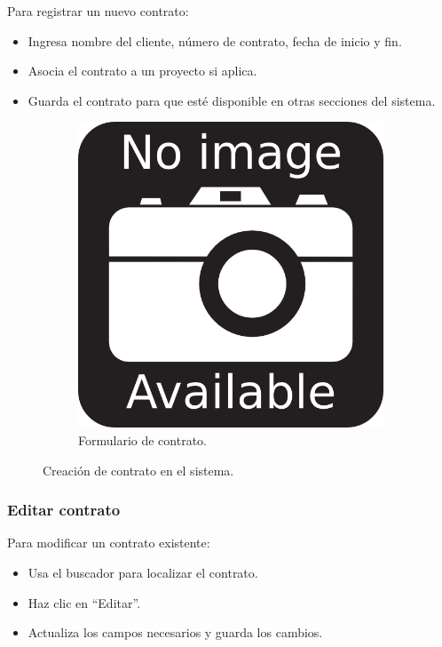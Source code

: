 Para registrar un nuevo contrato:

\begin{itemize}
    \item Ingresa nombre del cliente, número de contrato, fecha de inicio y fin.
    \item Asocia el contrato a un proyecto si aplica.
    \item Guarda el contrato para que esté disponible en otras secciones del sistema.
\end{itemize}

\begin{figure}[h]
\centering
\begin{subfigure}{0.4\textwidth}
    \includegraphics[width=\textwidth]{imgs/no-image.png}
    \caption{Formulario de contrato.}
    \label{fig:admin3}
\end{subfigure}
\caption{Creación de contrato en el sistema.}
\end{figure}

\subsubsection{Editar contrato}

Para modificar un contrato existente:

\begin{itemize}
    \item Usa el buscador para localizar el contrato.
    \item Haz clic en “Editar”.
    \item Actualiza los campos necesarios y guarda los cambios.
\end{itemize}

